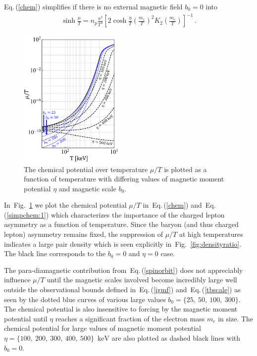 \documentclass[aps,prd,floatfix,reprint]{revtex4-2}
\newcommand*{\keV}{\text{ keV}}
\newcommand{\req}[1]{Eq.\,(\ref{#1})}
\newcommand{\rf}[1]{Fig.~{\ref{#1}}}
\begin{document}
\req{chem} simplifies if there is no external magnetic field $b_{0}=0$ into
\begin{align}
 \label{simpchem:1}
 \sinh\frac{\mu}{T}=n_{p}\frac{\pi^{2}}{T^{3}}\left[2\cosh\frac{\eta}{T}\left(\frac{m_{e}}{T}\right)^{2}K_{2}\left(\frac{m_{e}}{T}\right)\right]^{-1}\,.
\end{align}

\begin{figure}[ht]
 \centering
 \includegraphics[width=0.45\textwidth]{plots/ChemicalPotential_06.png}
 \caption{The chemical potential over temperature $\mu/T$ is plotted as a function of temperature with differing values of magnetic moment potential $\eta$ and magnetic scale $b_{0}$.}
 \label{fig:chemicalpotential}
\end{figure}

In~\rf{fig:chemicalpotential} we plot the chemical potential $\mu/T$ in~\req{chem} and~\req{simpchem:1} which characterizes the importance of the charged lepton asymmetry as a function of temperature. Since the baryon (and thus charged lepton) asymmetry remains fixed, the suppression of $\mu/T$ at high temperatures indicates a large pair density which is seen explicitly in~\rf{fig:densityratio}. The black line corresponds to the $b_{0}=0$ and $\eta=0$ case. 

The para-diamagnetic contribution from~\req{spinorbit} does not appreciably influence $\mu/T$ until the magnetic scales involved become incredibly large well outside the observational bounds defined in~\req{igmf} and~\req{tbscale} as seen by the dotted blue curves of various large values $b_{0}=\{25,\ 50,\ 100,\ 300\}$. The chemical potential is also insensitive to forcing by the magnetic moment potential until $\eta$ reaches a significant fraction of the electron mass $m_{e}$ in size. The chemical potential for large values of magnetic moment potential $\eta=\{100,\ 200,\ 300,\ 400,\ 500\}\,\keV$ are also plotted as dashed black lines with $b_{0}=0$.
\end{document}
